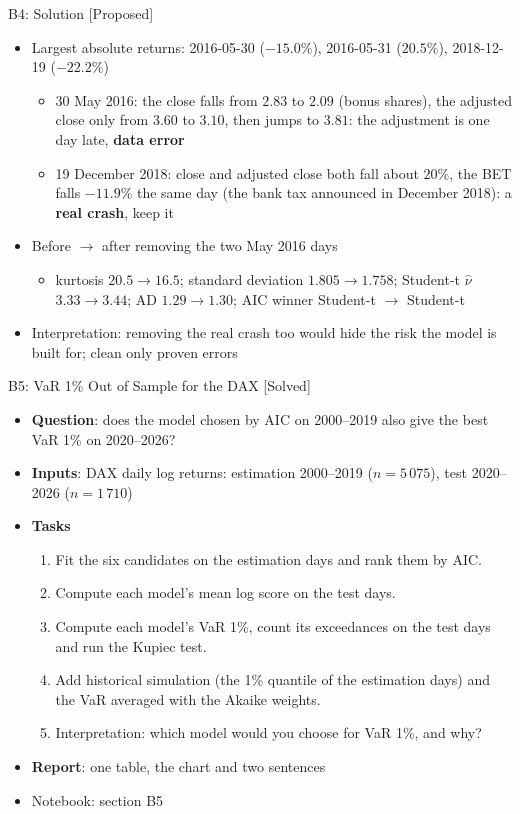 \ifsolutions
\begin{frame}{B4: Solution [Proposed]}
\itemsize{\scriptsize}
\begin{itemize}
    \item Largest absolute returns: 2016-05-30 ($-15.0\%$), 2016-05-31 ($20.5\%$), 2018-12-19 ($-22.2\%$)
    \begin{itemize}
        \item 30 May 2016: the close falls from $2.83$ to $2.09$ (bonus shares), the adjusted close only from $3.60$ to $3.10$, then jumps to $3.81$: the adjustment is one day late, \textbf{data error}
        \item 19 December 2018: close and adjusted close both fall about $20\%$, the BET falls $-11.9\%$ the same day (the bank tax announced in December 2018): a \textbf{real crash}, keep it
    \end{itemize}
    \item Before $\to$ after removing the two May 2016 days
    \begin{itemize}
        \item kurtosis $20.5 \to 16.5$; standard deviation $1.805 \to 1.758$; Student-t $\hat\nu$ $3.33 \to 3.44$; AD $1.29 \to 1.30$; AIC winner Student-t $\to$ Student-t
    \end{itemize}
    \item Interpretation: removing the real crash too would hide the risk the model is built for; clean only proven errors
\end{itemize}
\end{frame}
\fi

\begin{frame}{B5: VaR 1\% Out of Sample for the DAX [Solved]}
\itemsize{\scriptsize}
\begin{itemize}
\item \textbf{Question}: does the model chosen by AIC on 2000--2019 also give the best VaR 1\% on 2020--2026?
\item \textbf{Inputs}: DAX daily log returns: estimation 2000--2019 ($n = 5\,075$), test 2020--2026 ($n = 1\,710$)
\item \textbf{Tasks}
\begin{enumerate}
    \item Fit the six candidates on the estimation days and rank them by AIC.
    \item Compute each model's mean log score on the test days.
    \item Compute each model's VaR 1\%, count its exceedances on the test days and run the Kupiec test.
    \item Add historical simulation (the 1\% quantile of the estimation days) and the VaR averaged with the Akaike weights.
    \item Interpretation: which model would you choose for VaR 1\%, and why?
\end{enumerate}
\item \textbf{Report}: one table, the chart and two sentences
\item Notebook: section B5
\end{itemize}
\end{frame}

